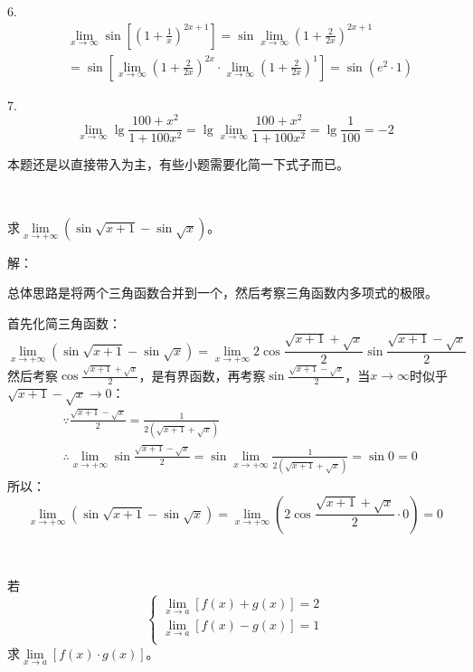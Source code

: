 6.
\begin{align*}
&\underset{x\rightarrow \infty}{\lim}\sin \left[ \left( 1+\frac{1}{x} \right) ^{2x+1} \right] =\sin \underset{x\rightarrow \infty}{\lim}\left( 1+\frac{2}{2x} \right) ^{2x+1} \\
&=\sin \left[ \underset{x\rightarrow \infty}{\lim}\left( 1+\frac{2}{2x} \right) ^{2x}\cdot \underset{x\rightarrow \infty}{\lim}\left( 1+\frac{2}{2x} \right) ^1 \right] =\sin \left( e^2\cdot 1 \right)
\end{align*}

7.
\[
\underset{x\rightarrow \infty}{\lim}\lg \frac{100+x^2}{1+100x^2}=\lg \underset{x\rightarrow \infty}{\lim}\frac{100+x^2}{1+100x^2}=\lg \frac{1}{100}=-2
\]

\begin{tcolorbox}
本题还是以直接带入为主，有些小题需要化简一下式子而已。
\end{tcolorbox}

~

\begin{exercise}
求$\underset{x\rightarrow +\infty}{\lim}\left( \sin \sqrt{x+1}-\sin \sqrt{x} \right) $。
\end{exercise}

解：

总体思路是将两个三角函数合并到一个，然后考察三角函数内多项式的极限。

首先化简三角函数：
\[
\underset{x\rightarrow +\infty}{\lim}\left( \sin \sqrt{x+1}-\sin \sqrt{x} \right) =\underset{x\rightarrow +\infty}{\lim}2\cos \frac{\sqrt{x+1}+\sqrt{x}}{2}\sin \frac{\sqrt{x+1}-\sqrt{x}}{2}
\]
然后考察$\cos \frac{\sqrt{x+1}+\sqrt{x}}{2}$，是有界函数，再考察$\sin \frac{\sqrt{x+1}-\sqrt{x}}{2}$，当$x\rightarrow \infty $时似乎$\sqrt{x+1}-\sqrt{x}\rightarrow 0$：
\begin{align*}
&\because \frac{\sqrt{x+1}-\sqrt{x}}{2}=\frac{1}{2\left( \sqrt{x+1}+\sqrt{x} \right)} \\
&\therefore \underset{x\rightarrow +\infty}{\lim}\sin \frac{\sqrt{x+1}-\sqrt{x}}{2}=\sin \underset{x\rightarrow +\infty}{\lim}\frac{1}{2\left( \sqrt{x+1}+\sqrt{x} \right)}=\sin 0=0
\end{align*}
所以：
\[
\underset{x\rightarrow +\infty}{\lim}\left( \sin \sqrt{x+1}-\sin \sqrt{x} \right) =\underset{x\rightarrow +\infty}{\lim}\left( 2\cos \frac{\sqrt{x+1}+\sqrt{x}}{2}\cdot 0 \right) =0
\]

~

\begin{exercise}
若
\[
\begin{cases}
	\underset{x\rightarrow a}{\lim}\left[ f\left( x \right) +g\left( x \right) \right] =2\\
	\underset{x\rightarrow a}{\lim}\left[ f\left( x \right) -g\left( x \right) \right] =1\\
\end{cases}
\]
求$\underset{x\rightarrow a}{\lim}\left[ f\left( x \right) \cdot g\left( x \right) \right] $。
\end{exercise}

